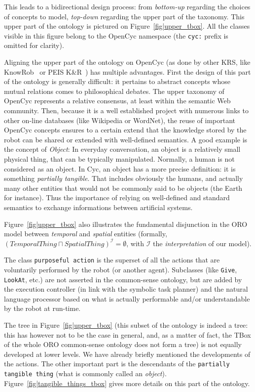 \documentclass[preprint,3p,times]{elsarticle}
\newcommand{\concept}[1]{{\small \texttt{#1}}}
\begin{document}
This leads to a bidirectional design process: from \emph{bottom-up} regarding
the choices of concepts to model, \emph{top-down} regarding the upper part of the
taxonomy. This upper part of the ontology is pictured on
Figure~\ref{fig|upper_tbox}. All the classes visible in this figure belong to the
{\sc OpenCyc} namespace (the {\tt cyc:} prefix is omitted for clarity).

Aligning the upper part of the ontology on {\sc OpenCyc} (as done by other
KRS, like {\sc KnowRob}~\cite{Tenorth2009a} or PEIS K\&R~\cite{Daoutis2009})
has multiple advantages. First the design of this part of the ontology is
generally difficult: it pertains to abstract concepts whose mutual relations
comes to philosophical debates. The upper taxonomy of {\sc OpenCyc} represents
a relative consensus, at least within the semantic Web community. Then, because
it is a well established project with numerous links to other on-line databases
(like Wikipedia or WordNet), the reuse of important {\sc OpenCyc} concepts
ensures to a certain extend that the knowledge stored by the robot can be
shared or extended with well-defined semantics. A good example is the concept
of \emph{Object}: In everyday conversation, an object is a relatively small
physical thing, that can be typically manipulated. Normally, a human is not
considered as an object. In {\sc Cyc}, an object has a more precise definition:
it is something \emph{partially tangible}. That includes obviously the humans,
and actually many other entities that would not be commonly said to be objects
(the Earth for instance). Thus the importance of relying on well-defined and
standard semantics to exchange informations between artificial systems.

Figure~\ref{fig|upper_tbox} also illustrates the fundamental disjunction
in the ORO model between \emph{temporal} and \emph{spatial} entities (formally,
$(TemporalThing \sqcap SpatialThing)^{\mathcal{I}} = \emptyset$, with
$\mathcal{I}$ the \emph{interpretation} of our model).

The class \concept{purposeful action} is the superset of all the actions that
are voluntarily performed by the robot (or another agent). Subclasses (like
\concept{Give}, \concept{LookAt}, etc.) are not asserted in the common-sense
ontology, but are added by the execution controller (in link with the symbolic
task planner) and the natural language processor based on what is actually
performable and/or understandable by the robot at run-time.

The tree in Figure~\ref{fig|upper_tbox} (this subset of the ontology is indeed
a tree: this has however not to be the case in general, and, as a matter of
fact, the TBox of the whole ORO common-sense ontology does not form a tree) is
not equally developed at lower levels. We have already briefly mentioned the
developments of the actions. The other important part is the descendants of the
\concept{partially tangible thing} (what is commonly called an \emph{object}).
Figure~\ref{fig|tangible_things_tbox} gives more details on this part of the
ontology.
\end{document}
